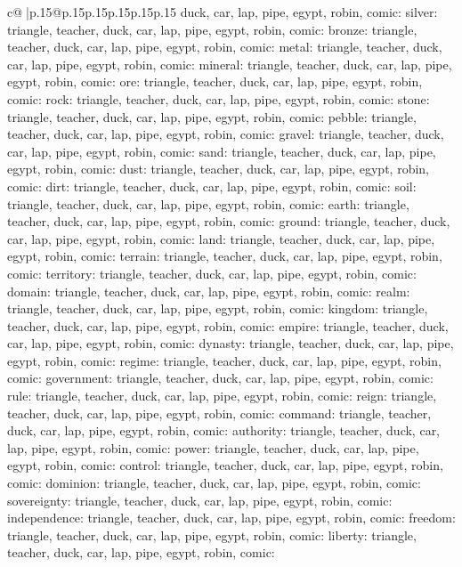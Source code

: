 \documentclass{article}
\begin{document}
{\begin{supertabular}{c@{$\;$}|p{.15\linewidth}@{}p{.15\linewidth}p{.15\linewidth}p{.15\linewidth}p{.15\linewidth}p{.15\linewidth}}
{{{duck, car, lap, pipe, egypt, robin, comic\n\nCLUE: silver\nTARGETS: triangle, teacher, duck, car, lap, pipe, egypt, robin, comic\n\nCLUE: bronze\nTARGETS: triangle, teacher, duck, car, lap, pipe, egypt, robin, comic\n\nCLUE: metal\nTARGETS: triangle, teacher, duck, car, lap, pipe, egypt, robin, comic\n\nCLUE: mineral\nTARGETS: triangle, teacher, duck, car, lap, pipe, egypt, robin, comic\n\nCLUE: ore\nTARGETS: triangle, teacher, duck, car, lap, pipe, egypt, robin, comic\n\nCLUE: rock\nTARGETS: triangle, teacher, duck, car, lap, pipe, egypt, robin, comic\n\nCLUE: stone\nTARGETS: triangle, teacher, duck, car, lap, pipe, egypt, robin, comic\n\nCLUE: pebble\nTARGETS: triangle, teacher, duck, car, lap, pipe, egypt, robin, comic\n\nCLUE: gravel\nTARGETS: triangle, teacher, duck, car, lap, pipe, egypt, robin, comic\n\nCLUE: sand\nTARGETS: triangle, teacher, duck, car, lap, pipe, egypt, robin, comic\n\nCLUE: dust\nTARGETS: triangle, teacher, duck, car, lap, pipe, egypt, robin, comic\n\nCLUE: dirt\nTARGETS: triangle, teacher, duck, car, lap, pipe, egypt, robin, comic\n\nCLUE: soil\nTARGETS: triangle, teacher, duck, car, lap, pipe, egypt, robin, comic\n\nCLUE: earth\nTARGETS: triangle, teacher, duck, car, lap, pipe, egypt, robin, comic\n\nCLUE: ground\nTARGETS: triangle, teacher, duck, car, lap, pipe, egypt, robin, comic\n\nCLUE: land\nTARGETS: triangle, teacher, duck, car, lap, pipe, egypt, robin, comic\n\nCLUE: terrain\nTARGETS: triangle, teacher, duck, car, lap, pipe, egypt, robin, comic\n\nCLUE: territory\nTARGETS: triangle, teacher, duck, car, lap, pipe, egypt, robin, comic\n\nCLUE: domain\nTARGETS: triangle, teacher, duck, car, lap, pipe, egypt, robin, comic\n\nCLUE: realm\nTARGETS: triangle, teacher, duck, car, lap, pipe, egypt, robin, comic\n\nCLUE: kingdom\nTARGETS: triangle, teacher, duck, car, lap, pipe, egypt, robin, comic\n\nCLUE: empire\nTARGETS: triangle, teacher, duck, car, lap, pipe, egypt, robin, comic\n\nCLUE: dynasty\nTARGETS: triangle, teacher, duck, car, lap, pipe, egypt, robin, comic\n\nCLUE: regime\nTARGETS: triangle, teacher, duck, car, lap, pipe, egypt, robin, comic\n\nCLUE: government\nTARGETS: triangle, teacher, duck, car, lap, pipe, egypt, robin, comic\n\nCLUE: rule\nTARGETS: triangle, teacher, duck, car, lap, pipe, egypt, robin, comic\n\nCLUE: reign\nTARGETS: triangle, teacher, duck, car, lap, pipe, egypt, robin, comic\n\nCLUE: command\nTARGETS: triangle, teacher, duck, car, lap, pipe, egypt, robin, comic\n\nCLUE: authority\nTARGETS: triangle, teacher, duck, car, lap, pipe, egypt, robin, comic\n\nCLUE: power\nTARGETS: triangle, teacher, duck, car, lap, pipe, egypt, robin, comic\n\nCLUE: control\nTARGETS: triangle, teacher, duck, car, lap, pipe, egypt, robin, comic\n\nCLUE: dominion\nTARGETS: triangle, teacher, duck, car, lap, pipe, egypt, robin, comic\n\nCLUE: sovereignty\nTARGETS: triangle, teacher, duck, car, lap, pipe, egypt, robin, comic\n\nCLUE: independence\nTARGETS: triangle, teacher, duck, car, lap, pipe, egypt, robin, comic\n\nCLUE: freedom\nTARGETS: triangle, teacher, duck, car, lap, pipe, egypt, robin, comic\n\nCLUE: liberty\nTARGETS: triangle, teacher, duck, car, lap, pipe, egypt, robin, comic\n\nCLUE: }}}
\end{supertabular}}
\end{document}
